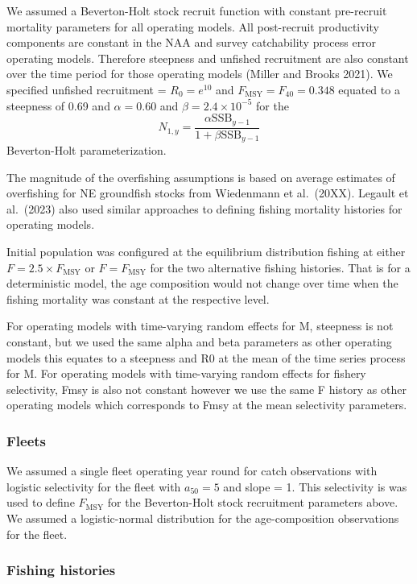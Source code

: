 \documentclass[
  12pt,
]{article}
\begin{document}
We assumed a Beverton-Holt stock recruit function with constant
pre-recruit mortality parameters for all operating models. All
post-recruit productivity components are constant in the NAA and survey
catchability process error operating models. Therefore steepness and
unfished recruitment are also constant over the time period for those
operating models (Miller and Brooks 2021). We specified unfished
recruitment = \(R_0 = e^{10}\) and \(F_{\text{MSY}} = F_{40} = 0.348\)
equated to a steepness of 0.69 and \(\alpha=0.60\) and
\(\beta = 2.4 \times 10^{-5}\) for the \[
N_{1,y} = \frac{\alpha \text{SSB}_{y-1}}{1 + \beta \text{SSB}_{y-1}} 
\] Beverton-Holt parameterization.

The magnitude of the overfishing assumptions is based on average
estimates of overfishing for NE groundfish stocks from Wiedenmann et
al.~(20XX). Legault et al.~(2023) also used similar approaches to
defining fishing mortality histories for operating models.

Initial population was configured at the equilibrium distribution
fishing at either \(F = 2.5\times F_{\text{MSY}}\) or
\(F = F_{\text{MSY}}\) for the two alternative fishing histories. That
is for a deterministic model, the age composition would not change over
time when the fishing mortality was constant at the respective level.

For operating models with time-varying random effects for M, steepness
is not constant, but we used the same alpha and beta parameters as other
operating models this equates to a steepness and R0 at the mean of the
time series process for M. For operating models with time-varying random
effects for fishery selectivity, Fmsy is also not constant however we
use the same F history as other operating models which corresponds to
Fmsy at the mean selectivity parameters.

\hypertarget{fleets}{%
\subsubsection{Fleets}\label{fleets}}

We assumed a single fleet operating year round for catch observations
with logistic selectivity for the fleet with \(a_{50} = 5\) and slope =
1. This selectivity is was used to define \(F_{\text{MSY}}\) for the
Beverton-Holt stock recruitment parameters above. We assumed a
logistic-normal distribution for the age-composition observations for
the fleet.

\hypertarget{fishing-histories}{%
\subsubsection{Fishing histories}\label{fishing-histories}}
\end{document}

